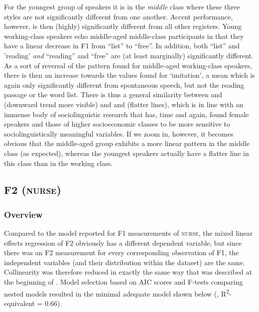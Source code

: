 For the youngest group of speakers it is in the \emph{middle} class where these three styles are not significantly different from one another.
Accent performance, however, is then (highly) significantly different from all other registers.
Young work\-ing-class speakers echo middle-aged middle-class participants in that they have a linear decrease in F1 from ``list'' to ``free''.
In addition, both ``list'' and 'reading' \emph{and} ``reading'' and ``free'' are (at least marginally) significantly different.
As a sort of reversal of the pattern found for middle-aged working-class speakers, there is then an increase towards the values found for `imitation', a mean which is again only significantly different from spontaneous speech, but not the reading passage or the word list.
There is thus a general similarity between  and  (downward trend more visible) and  and  (flatter lines), which is in line with an immense body of sociolinguistic research that has, time and again, found female speakers and those of higher socioeconomic classes to be more sensitive to sociolinguistically meaningful variables.
If we zoom in, however, it becomes obvious that the middle-aged group exhibits a more linear pattern in the middle class (as expected), whereas the youngest speakers actually have a flatter line in this class than in the working class.

\subsection{F2 (\textsc{nurse})}
\label{sec.prod.res.vow.nurse.f2}

\subsubsection{Overview}
\label{sec.prod.res.vow.nurse.f2.overview}

Compared to the model reported for F1 measurements of \textsc{nurse}, the mixed linear effects regression of F2 obviously has a different dependent variable, but since there was an F2 measurement for every corresponding observation of F1, the independent variables (and their distribution within the dataset) are the same.
Collinearity was therefore reduced in exactly the same way that was described at the beginning of .
Model selection based on AIC scores and F-tests comparing nested models resulted in the minimal adequate model shown below (, R\textsuperscript{2}-equivalent = 0.66).

